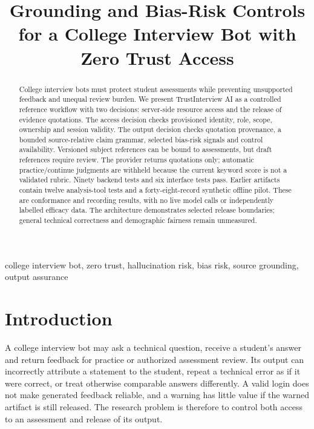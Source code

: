 \documentclass[conference]{IEEEtran}
\begin{document}
\title{Grounding and Bias-Risk Controls for a College Interview Bot with Zero Trust Access}
\author{
}
\maketitle

\begin{abstract}
College interview bots must protect student assessments while preventing unsupported feedback and unequal review burden. We present TrustInterview AI as a controlled reference workflow with two decisions: server-side resource access and the release of evidence quotations. The access decision checks provisioned identity, role, scope, ownership and session validity. The output decision checks quotation provenance, a bounded source-relative claim grammar, selected bias-risk signals and control availability. Versioned subject references can be bound to assessments, but draft references require review. The provider returns quotations only; automatic practice/continue judgments are withheld because the current keyword score is not a validated rubric. Ninety backend tests and six interface tests pass. Earlier artifacts contain twelve analysis-tool tests and a forty-eight-record synthetic offline pilot. These are conformance and recording results, with no live model calls or independently labelled efficacy data. The architecture demonstrates selected release boundaries; general technical correctness and demographic fairness remain unmeasured.
\end{abstract}
\begin{IEEEkeywords}
college interview bot, zero trust, hallucination risk, bias risk, source grounding, output assurance
\end{IEEEkeywords}

\section{Introduction}
A college interview bot may ask a technical question, receive a student's answer and return feedback for practice or authorized assessment review. Its output can incorrectly attribute a statement to the student, repeat a technical error as if it were correct, or treat otherwise comparable answers differently. A valid login does not make generated feedback reliable, and a warning has little value if the warned artifact is still released. The research problem is therefore to control both access to an assessment and release of its output.
\end{document}
